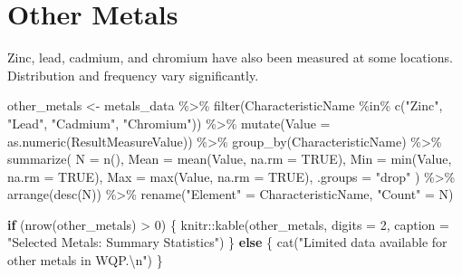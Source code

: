\documentclass[
  letterpaper,
]{scrbook}
\newenvironment{Shaded}{\begin{snugshade}}{\end{snugshade}}
\newcommand{\AttributeTok}[1]{\textcolor[rgb]{0.40,0.45,0.13}{#1}}
\newcommand{\ConstantTok}[1]{\textcolor[rgb]{0.56,0.35,0.01}{#1}}
\newcommand{\ControlFlowTok}[1]{\textcolor[rgb]{0.00,0.23,0.31}{\textbf{#1}}}
\newcommand{\DecValTok}[1]{\textcolor[rgb]{0.68,0.00,0.00}{#1}}
\newcommand{\FunctionTok}[1]{\textcolor[rgb]{0.28,0.35,0.67}{#1}}
\newcommand{\NormalTok}[1]{\textcolor[rgb]{0.00,0.23,0.31}{#1}}
\newcommand{\OtherTok}[1]{\textcolor[rgb]{0.00,0.23,0.31}{#1}}
\newcommand{\SpecialCharTok}[1]{\textcolor[rgb]{0.37,0.37,0.37}{#1}}
\newcommand{\StringTok}[1]{\textcolor[rgb]{0.13,0.47,0.30}{#1}}
\begin{document}
\section{Other Metals}\label{other-metals}

Zinc, lead, cadmium, and chromium have also been measured at some
locations. Distribution and frequency vary significantly.

\begin{Shaded}
\begin{Highlighting}[]
\NormalTok{other\_metals }\OtherTok{\textless{}{-}}\NormalTok{ metals\_data }\SpecialCharTok{\%\textgreater{}\%}
  \FunctionTok{filter}\NormalTok{(CharacteristicName }\SpecialCharTok{\%in\%} \FunctionTok{c}\NormalTok{(}\StringTok{"Zinc"}\NormalTok{, }\StringTok{"Lead"}\NormalTok{, }\StringTok{"Cadmium"}\NormalTok{, }\StringTok{"Chromium"}\NormalTok{)) }\SpecialCharTok{\%\textgreater{}\%}
  \FunctionTok{mutate}\NormalTok{(}\AttributeTok{Value =} \FunctionTok{as.numeric}\NormalTok{(ResultMeasureValue)) }\SpecialCharTok{\%\textgreater{}\%}
  \FunctionTok{group\_by}\NormalTok{(CharacteristicName) }\SpecialCharTok{\%\textgreater{}\%}
  \FunctionTok{summarize}\NormalTok{(}
    \AttributeTok{N =} \FunctionTok{n}\NormalTok{(),}
    \AttributeTok{Mean =} \FunctionTok{mean}\NormalTok{(Value, }\AttributeTok{na.rm =} \ConstantTok{TRUE}\NormalTok{),}
    \AttributeTok{Min =} \FunctionTok{min}\NormalTok{(Value, }\AttributeTok{na.rm =} \ConstantTok{TRUE}\NormalTok{),}
    \AttributeTok{Max =} \FunctionTok{max}\NormalTok{(Value, }\AttributeTok{na.rm =} \ConstantTok{TRUE}\NormalTok{),}
    \AttributeTok{.groups =} \StringTok{"drop"}
\NormalTok{  ) }\SpecialCharTok{\%\textgreater{}\%}
  \FunctionTok{arrange}\NormalTok{(}\FunctionTok{desc}\NormalTok{(N)) }\SpecialCharTok{\%\textgreater{}\%}
  \FunctionTok{rename}\NormalTok{(}\StringTok{"Element"} \OtherTok{=}\NormalTok{ CharacteristicName, }\StringTok{"Count"} \OtherTok{=}\NormalTok{ N)}

\ControlFlowTok{if}\NormalTok{ (}\FunctionTok{nrow}\NormalTok{(other\_metals) }\SpecialCharTok{\textgreater{}} \DecValTok{0}\NormalTok{) \{}
\NormalTok{  knitr}\SpecialCharTok{::}\FunctionTok{kable}\NormalTok{(other\_metals, }\AttributeTok{digits =} \DecValTok{2}\NormalTok{, }\AttributeTok{caption =} \StringTok{"Selected Metals: Summary Statistics"}\NormalTok{)}
\NormalTok{\} }\ControlFlowTok{else}\NormalTok{ \{}
  \FunctionTok{cat}\NormalTok{(}\StringTok{"Limited data available for other metals in WQP.}\SpecialCharTok{\textbackslash{}n}\StringTok{"}\NormalTok{)}
\NormalTok{\}}
\end{Highlighting}
\end{Shaded}
\end{document}
